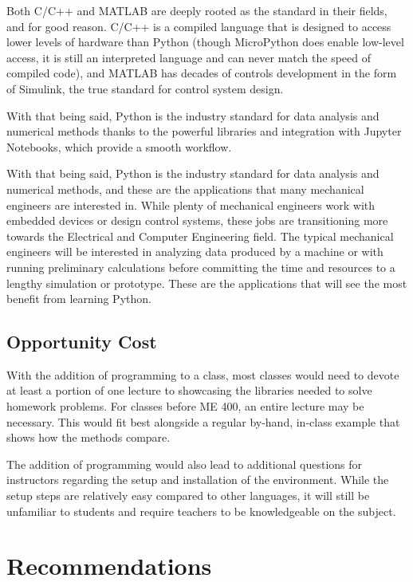 Both C/C++ and MATLAB are deeply rooted as the standard in their fields,
and for good reason. C/C++ is a compiled language that is designed
to access lower levels of hardware than Python (though MicroPython does
enable low-level access, it is still an interpreted language and can
never match the speed of compiled code), and MATLAB has decades of controls
development in the form of Simulink, the true standard for control system 
design.

With that being said, Python is the industry standard for data analysis 
and numerical methods thanks to the powerful libraries and 
integration with Jupyter Notebooks, which provide a smooth workflow. 

With that being said, Python is the industry standard for data analysis 
and numerical methods, and these are the applications that many mechanical
engineers are interested in. While plenty of mechanical engineers work 
with embedded devices or design control systems, these jobs are 
transitioning more towards the Electrical and Computer Engineering field.
The typical mechanical engineers will be interested in analyzing data produced 
by a machine or with running preliminary calculations before committing
the time and resources to a lengthy simulation or prototype. These are 
the applications that will see the most benefit from learning Python.

\subsection{Opportunity Cost}

With the addition of programming to a class, most classes would need to devote
at least a portion of one lecture to showcasing the libraries needed to 
solve homework problems. For classes before ME 400, an entire lecture may
be necessary. This would fit best alongside a regular by-hand, in-class
example that shows how the methods compare.

The addition of programming would also lead to additional questions for
instructors regarding the setup and installation of the environment. While
the setup steps are relatively easy compared to other languages, it will
still be unfamiliar to students and require teachers to be knowledgeable
on the subject.

\section{Recommendations}

